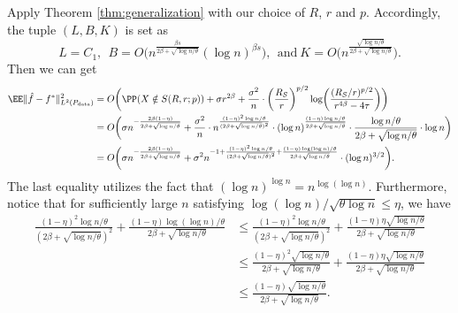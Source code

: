     Apply Theorem \ref{thm:generalization} with our choice of $R$, $r$ and $p$. Accordingly, the tuple $(L,B,K)$ is set as
    \begin{equation*}
        L= C_1,~~B=O\biggl(n^{\frac{\beta s}{2\beta+\sqrt{\log n/\theta}}} (\log n)^{\beta s} \biggr), ~~ \text{and}~K=O\biggl(n^{\frac{\sqrt{\log n/\theta}}{2\beta + \sqrt{\log n/\theta} } } \biggr).
    \end{equation*}
    Then we can get
    \begin{align*}
        \EE \norm{ \hat{f} - f^*}^2_{L^2(P_{\rm data})} &= O\biggl(  \PP(X \notin S(R,r;p) ) + \sigma r^{2\beta} + \frac{\sigma^2}{n} \cdot \biggl(\frac{R_S}{r} \biggr)^{p/2} \log\biggl( \frac{(R_S/r)^{p/2}}{ r^{4\beta}-4\tau}\biggr) \biggr)\\
        &= O\biggl(  \sigma n^{- \frac{2\beta(1-\eta)}{2\beta+\sqrt{\log n/\theta}}} + \frac{\sigma ^2}{n} \cdot n^ \frac{(1-\eta)^2\log n /\theta}{ (2\beta +\sqrt{\log n /\theta})^2} \cdot (\log n)^\frac{(1-\eta)\log n /\theta}{2\beta +\sqrt{\log n /\theta}} \cdot \frac{\log n/\theta}{2\beta +\sqrt{\log n /\theta}}\cdot \log n \biggr)\\
        &= O\biggl( \sigma  n^{- \frac{2\beta(1-\eta)}{2\beta+\sqrt{\log n/\theta}}} + \sigma^2  n^{-1 + \frac{(1-\eta)^2\log n /\theta}{ (2\beta +\sqrt{\log n /\theta})^2} + \frac{(1-\eta)\log(\log n)/\theta}{2\beta +\sqrt{\log n /\theta}} }   \cdot (\log n)^{3/2} \biggr).
    \end{align*}
    The last equality utilizes the fact that $(\log n)^{\log n}=n^{\log(\log n)}$. Furthermore, notice that for sufficiently large $n$ satisfying $\log(\log n) / \sqrt{\theta \log n} \leq \eta$, we have
    \begin{align*}
        \frac{(1-\eta)^2\log n /\theta}{ (2\beta +\sqrt{\log n /\theta})^2} + \frac{(1-\eta)\log(\log n)/\theta}{2\beta +\sqrt{\log n /\theta}} &\leq  \frac{(1-\eta)^2\log n /\theta}{ (2\beta +\sqrt{\log n /\theta})^2} + \frac{(1-\eta)\eta \sqrt{\log n/\theta}}{2\beta +\sqrt{\log n /\theta}} \\
        &\leq    \frac{(1-\eta)^2 \sqrt{\log n /\theta} }{ 2\beta +\sqrt{\log n /\theta}} + \frac{(1-\eta)\eta \sqrt{\log n/\theta}}{2\beta +\sqrt{\log n /\theta}}\\
        &\leq \frac{(1-\eta) \sqrt{\log n/\theta}}{2\beta +\sqrt{\log n /\theta}}.
    \end{align*}

